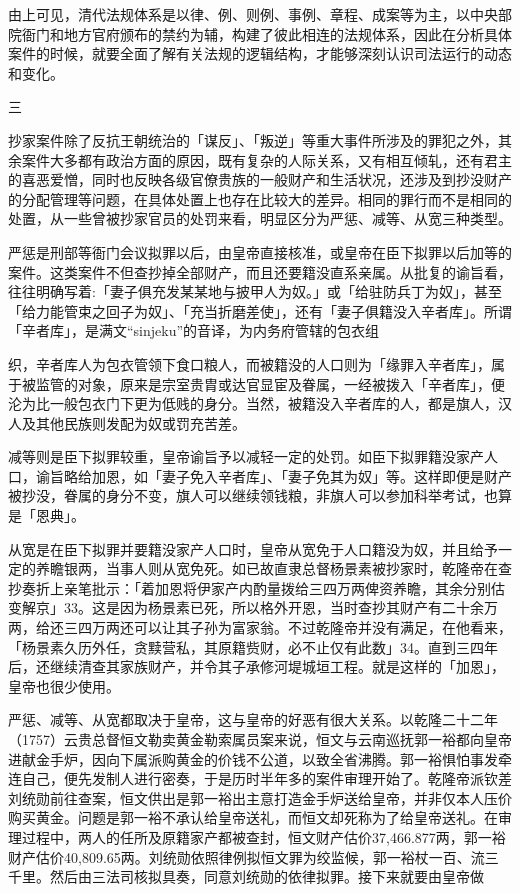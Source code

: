 由上可见，清代法规体系是以律、例、则例、事例、章程、成案等为主，以中央部院衙门和地方官府颁布的禁约为辅，构建了彼此相连的法规体系，因此在分析具体案件的时候，就要全面了解有关法规的逻辑结构，才能够深刻认识司法运行的动态和变化。

三

抄家案件除了反抗王朝统治的「谋反」、「叛逆」等重大事件所涉及的罪犯之外，其余案件大多都有政治方面的原因，既有复杂的人际关系，又有相互倾轧，还有君主的喜恶爱憎，同时也反映各级官僚贵族的一般财产和生活状况，还涉及到抄没财产的分配管理等问题，在具体处置上也存在比较大的差异。相同的罪行而不是相同的处置，从一些曾被抄家官员的处罚来看，明显区分为严惩、减等、从宽三种类型。

严惩是刑部等衙门会议拟罪以后，由皇帝直接核准，或皇帝在臣下拟罪以后加等的案件。这类案件不但查抄掉全部财产，而且还要籍没直系亲属。从批复的谕旨看，往往明确写着:「妻子俱充发某某地与披甲人为奴。」或「给驻防兵丁为奴」，甚至「给力能管束之回子为奴」、「充当折磨差使」，还有「妻子俱籍没入辛者库」。所谓「辛者库」，是满文“sinjeku”的音译，为内务府管辖的包衣组

\vfill
\begin{BookNotes}
\end{BookNotes}

\noindent 织，辛者库人为包衣管领下食口粮人，而被籍没的人口则为「缘罪入辛者库」，属于被监管的对象，原来是宗室贵胄或达官显宦及眷属，一经被拨入「辛者库」，便沦为比一般包衣门下更为低贱的身分。当然，被籍没入辛者库的人，都是旗人，汉人及其他民族则发配为奴或罚充苦差。

减等则是臣下拟罪较重，皇帝谕旨予以减轻一定的处罚。如臣下拟罪籍没家产人口，谕旨略给加恩，如「妻子免入辛者库」、「妻子免其为奴」等。这样即便是财产被抄没，眷属的身分不变，旗人可以继续领钱粮，非旗人可以参加科举考试，也算是「恩典」。

从宽是在臣下拟罪并要籍没家产人口时，皇帝从宽免于人口籍没为奴，并且给予一定的养瞻银两，当事人则从宽免死。如已故直隶总督杨景素被抄家时，乾隆帝在查抄奏折上亲笔批示：「着加恩将伊家产内酌量拨给三四万两俾资养瞻，其余分别估变解京」33。这是因为杨景素已死，所以格外开恩，当时查抄其财产有二十余万两，给还三四万两还可以让其子孙为富家翁。不过乾隆帝并没有满足，在他看来，「杨景素久历外任，贪黩营私，其原籍赀财，必不止仅有此数」34。直到三四年后，还继续清查其家族财产，并令其子承修河堤城垣工程。就是这样的「加恩」，皇帝也很少使用。

严惩、减等、从宽都取决于皇帝，这与皇帝的好恶有很大关系。以乾隆二十二年（1757）云贵总督恒文勒卖黄金勒索属员案来说，恒文与云南巡抚郭一裕都向皇帝进献金手炉，因向下属派购黄金的价钱不公道，以致全省沸腾。郭一裕惧怕事发牵连自己，便先发制人进行密奏，于是历时半年多的案件审理开始了。乾隆帝派钦差刘统勋前往查案，恒文供出是郭一裕出主意打造金手炉送给皇帝，并非仅本人压价购买黄金。问题是郭一裕不承认给皇帝送礼，而恒文却死称为了给皇帝送礼。在审理过程中，两人的任所及原籍家产都被查封，恒文财产估价37,466.877两，郭一裕财产估价40,809.65两。刘统勋依照律例拟恒文罪为绞监候，郭一裕杖一百、流三千里。然后由三法司核拟具奏，同意刘统勋的依律拟罪。接下来就要由皇帝做

